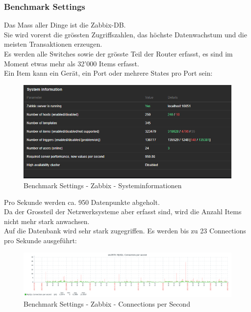 
\clearpage
\begin{flushleft}
    \subsubsection{Benchmark Settings}
    \label{subsubsec:benchmark_settings}
    Das Mass aller Dinge ist die Zabbix-DB. \\
    Sie wird vorerst die grössten Zugriffszahlen, das höchste Datenwachstum und die meisten Transaktionen erzeugen.\\
    Es werden alle Switches sowie der grösste Teil der Router erfasst, es sind im Moment etwas mehr als 32'000 Items erfasst.\\
    Ein Item kann ein Gerät, ein Port oder mehrere States pro Port sein:
    \begin{figure}[H]
        \centering
        \includegraphics[width=0.8\linewidth]{source/implementation/evaluation/benchmarking/sks0970_zabbix_system_information}
        \caption{Benchmark Settings - Zabbix - Systeminformationen}
        \label{fig:sks0970_zabbix_system_information}
    \end{figure}
    Pro Sekunde werden ca. 950 Datenpunkte abgeholt.\\
    Da der Grossteil der Netzwerksysteme aber erfasst sind, wird die Anzahl Items nicht mehr stark anwachsen.\\
    Auf die Datenbank wird sehr stark zugegriffen.
    Es werden bis zu 23 Connections pro Sekunde ausgeführt:
    \begin{figure}[H]
        \centering
        \includegraphics[width=0.8\linewidth]{source/implementation/evaluation/benchmarking/sks0970_zabbix_mariadb_connections_per_second_graph}
        \caption{Benchmark Settings - Zabbix - Connections per Second}
        \label{fig:sks0970_zabbix_mariadb_connections_per_second_graph}
    \end{figure}
\end{flushleft}
